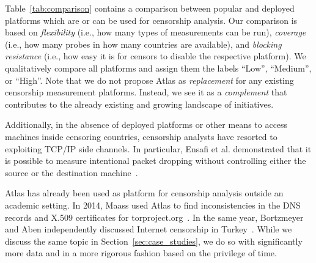 Table~\ref{tab:comparison} contains a comparison between popular and deployed
platforms which are or can be used for censorship analysis.  Our comparison is
based on \emph{flexibility} (i.e., how many types of measurements can be run),
\emph{coverage} (i.e., how many probes in how many countries are available),
and \emph{blocking resistance} (i.e., how easy it is for censors to disable the
respective platform).  We qualitatively compare all platforms and assign them
the labels ``Low'', ``Medium'', or ``High''.  Note that we do not propose
Atlas as \emph{replacement} for any existing censorship measurement platforms.
Instead, we see it as a \emph{complement} that contributes to the already
existing and growing landscape of initiatives.

Additionally, in the absence of deployed platforms or other means to access machines inside
censoring countries, censorship analysts have resorted to exploiting TCP/IP
side channels.  In particular, Ensafi et al. demonstrated that it is possible
to measure intentional packet dropping without controlling either the source or
the destination machine~\cite{Ensafi2014}.

Atlas has already been used as platform for censorship analysis outside an
academic setting.  In 2014, Maass used Atlas to find inconsistencies in the DNS
records and X.509 certificates for torproject.org~\cite{Maass2014}.  In the
same year, Bortzmeyer and Aben independently discussed Internet censorship in
Turkey~\cite{Bortzmeyer14,Aben14}.  While we discuss the same topic in
Section~\ref{sec:case_studies}, we do so with significantly more data and in a
more rigorous fashion based on the privilege of time.